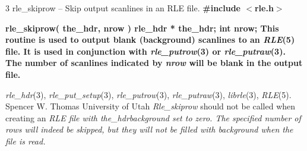 %
%
%
 3
rle\_skiprow -- Skip output scanlines in an RLE file.
\bf
\#include $<$rle.h$>$
\par\vspace{1.0\baselineskip}
\bf
rle\_skiprow( the\_hdr, nrow )
\nwl
\bf
rle\_hdr * the\_hdr;
\nwl
\bf
int nrow;
This routine is used to output blank (background) scanlines to an 
{\it RLE}{\rm (5)}
file.  It is used in conjunction with
{\it rle\_putrow}{\rm (3)}
or
{\it rle\_putraw}{\rm (3).}
The number of scanlines indicated by
{\it nrow}
will be blank in the output file.
\raggedright
{\it rle\_hdr}{\rm (3),}
{\it rle\_put\_setup}{\rm (3),}
{\it rle\_putrow}{\rm (3),}
{\it rle\_putraw}{\rm (3),}
{\it librle}{\rm (3),}
{\it RLE}{\rm (5).}
Spencer W. Thomas
\nwl
University of Utah
{\it Rle\_skiprow}
should not be called when creating an %
\it RLE \rm%
file with 
{\it the\_hdr}{\rm }{\it background}
set to zero.  The specified number of rows will indeed be skipped, but
they will not be filled with background when the file is read.
\newpage


%
%
%

